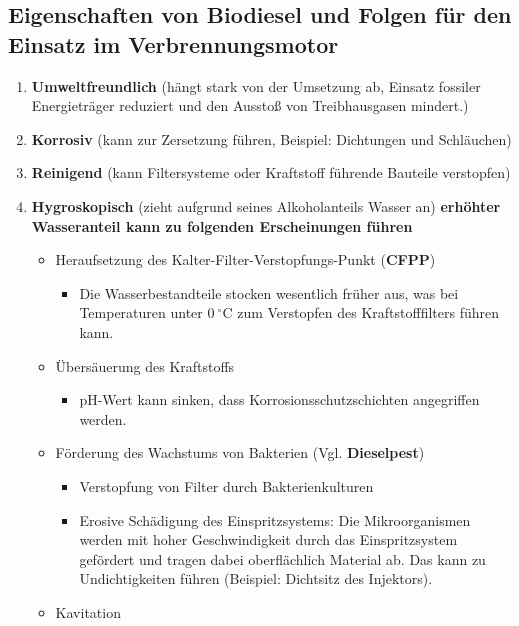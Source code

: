 \subsection{Eigenschaften von Biodiesel und Folgen für den Einsatz im
Verbrennungsmotor}\label{eigenschaften-von-biodiesel-und-folgen-fuer-den-einsatz-im-verbrennungsmotor}

\begin{enumerate}
\item
  \textbf{Umweltfreundlich} (hängt stark von der Umsetzung ab, Einsatz
  fossiler Energieträger reduziert und den Ausstoß von Treibhausgasen
  mindert.)
\item
  \textbf{Korrosiv} (kann zur Zersetzung führen, Beispiel: Dichtungen
  und Schläuchen)
\item
  \textbf{Reinigend} (kann Filtersysteme oder Kraftstoff führende
  Bauteile verstopfen)
\item
  \textbf{Hygroskopisch} (zieht aufgrund seines Alkoholanteils Wasser
  an) \textbf{erhöhter Wasseranteil kann zu folgenden Erscheinungen
  führen}

  \begin{itemize}
  \item
    Heraufsetzung des Kalter-Filter-Verstopfungs-Punkt (\textbf{CFPP})

    \begin{itemize}
    \item
      Die Wasserbestandteile stocken wesentlich früher aus, was bei
      Temperaturen unter $0~^\circ\text{C}$ zum Verstopfen des
      Kraftstofffilters führen kann.
    \end{itemize}
  \item
    Übersäuerung des Kraftstoffs

    \begin{itemize}
    \item
      pH-Wert kann sinken, dass Korrosionsschutzschichten angegriffen
      werden.
    \end{itemize}
  \item
    Förderung des Wachstums von Bakterien (Vgl. \textbf{Dieselpest})

    \begin{itemize}
    \item
      Verstopfung von Filter durch Bakterienkulturen
    \item
      Erosive Schädigung des Einspritzsystems: Die Mikroorganismen
      werden mit hoher Geschwindigkeit durch das Einspritzsystem
      gefördert und tragen dabei oberflächlich Material ab. Das kann zu
      Undichtigkeiten führen (Beispiel: Dichtsitz des Injektors).
    \end{itemize}
  \item
    Kavitation


\end{itemize}
\end{enumerate}
